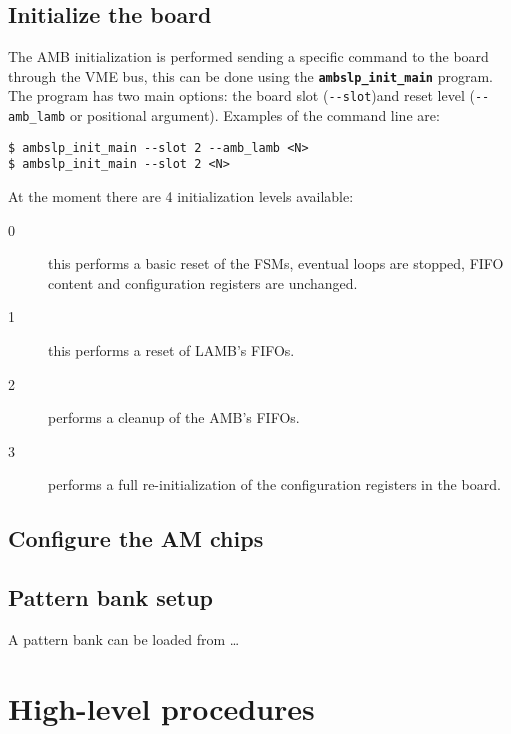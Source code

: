 \documentclass[UKenglish]{latex/atlasdoc}
\begin{document}
\subsection{Initialize the board}
\label{sec:ambslpinit}

The AMB initialization is performed sending a specific command
to the board through the VME bus, this can be done using the 
\textbf{\texttt{ambslp\_init\_main}} program. The program has two
main options: the board slot (\verb|--slot|)and reset level (\verb|--amb_lamb| 
or positional argument).
Examples of the command line are:
\begin{verbatim}
$ ambslp_init_main --slot 2 --amb_lamb <N>
$ ambslp_init_main --slot 2 <N>
\end{verbatim}

At the moment there are 4 initialization levels available:
\begin{description}
	\item[0] this performs a basic reset of the FSMs, eventual loops
	are stopped, FIFO content and configuration registers are unchanged.
	
	\item[1] this performs a reset of LAMB's FIFOs.
	
	\item[2] performs a cleanup of the AMB's FIFOs.
	
	\item[3] performs a full re-initialization of the configuration registers
	in the board.
\end{description}


\subsection{Configure the AM chips}



\subsection{Pattern bank setup}
\label{sec:bankload}

A pattern bank can be loaded from \ldots

\section{High-level procedures}
\label{sec:highlevel}


\end{document}
